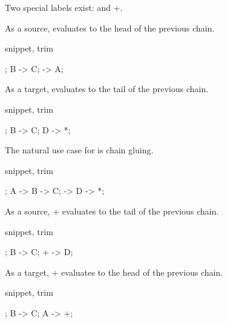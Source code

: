 \begingroup{}

Two special labels exist: {\ttfamily *} and {\ttfamily +}.

As a source, {\ttfamily *} evaluates to the head of the previous chain.

\begin{tcblisting}{snippet, trim}
\begin{codi}
;
\mor B -> C;
\mor * -> A;
\end{codi}
\end{tcblisting}

As a target, {\ttfamily *} evaluates to the tail of the previous chain.

\begin{tcblisting}{snippet, trim}
\begin{codi}
;
\mor B -> C;
\mor D -> *;
\end{codi}
\end{tcblisting}

The natural use case for {\ttfamily *} is chain gluing.

\begin{tcblisting}{snippet, trim}
\begin{codi}
;
\mor A -> B -> C;
\mor * -> D -> *;
\end{codi}
\end{tcblisting}

As a source, {\ttfamily +} evaluates to the tail of the previous chain.

\begin{tcblisting}{snippet, trim}
\begin{codi}
;
\mor B -> C;
\mor + -> D;
\end{codi}
\end{tcblisting}

As a target, {\ttfamily +} evaluates to the head of the previous chain.

\begin{tcblisting}{snippet, trim}
\begin{codi}
;
\mor B -> C;
\mor A -> +;
\end{codi}
\end{tcblisting}

